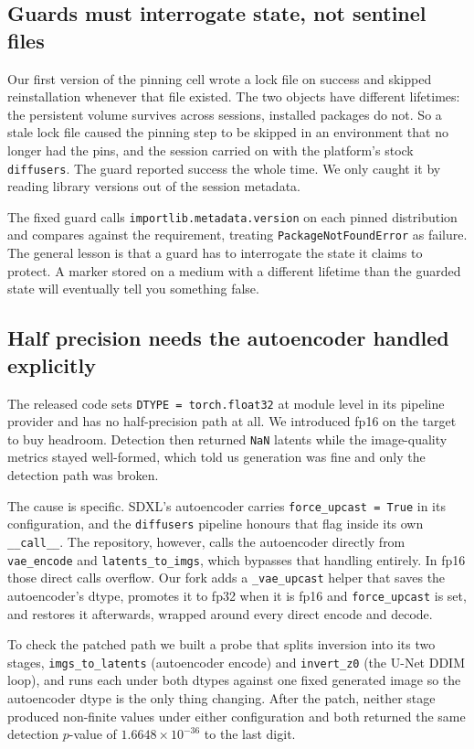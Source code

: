 \documentclass[10pt,twocolumn]{article}
\newcommand{\code}[1]{\texttt{\small #1}}
\begin{document}
\subsection{Guards must interrogate state, not sentinel files}

Our first version of the pinning cell wrote a lock file on success and skipped
reinstallation whenever that file existed. The two objects have different lifetimes:
the persistent volume survives across sessions, installed packages do not. So a stale
lock file caused the pinning step to be skipped in an environment that no longer had
the pins, and the session carried on with the platform's stock \code{diffusers}. The
guard reported success the whole time. We only caught it by reading library versions
out of the session metadata.

The fixed guard calls \code{importlib.metadata.version} on each pinned distribution
and compares against the requirement, treating \code{PackageNotFoundError} as failure.
The general lesson is that a guard has to interrogate the state it claims to protect.
A marker stored on a medium with a different lifetime than the guarded state will
eventually tell you something false.

\subsection{Half precision needs the autoencoder handled explicitly}
\label{sec:fp16}

The released code sets \code{DTYPE = torch.float32} at module level in its pipeline
provider and has no half-precision path at all. We introduced fp16 on the target to
buy headroom. Detection then returned \code{NaN} latents while the image-quality
metrics stayed well-formed, which told us generation was fine and only the detection
path was broken.

The cause is specific. SDXL's autoencoder carries \code{force\_upcast = True} in its
configuration, and the \code{diffusers} pipeline honours that flag inside its own
\code{\_\_call\_\_}. The repository, however, calls the autoencoder directly from
\code{vae\_encode} and \code{latents\_to\_imgs}, which bypasses that handling
entirely. In fp16 those direct calls overflow. Our fork adds a
\code{\_vae\_upcast} helper that saves the autoencoder's dtype, promotes it to fp32
when it is fp16 and \code{force\_upcast} is set, and restores it afterwards, wrapped
around every direct encode and decode.

To check the patched path we built a probe that splits inversion into its two stages,
\code{imgs\_to\_latents} (autoencoder encode) and \code{invert\_z0} (the U-Net DDIM
loop), and runs each under both dtypes against one fixed generated image so the
autoencoder dtype is the only thing changing. After the patch, neither stage produced
non-finite values under either configuration and both returned the same detection
$p$-value of $1.6648 \times 10^{-36}$ to the last digit.
\end{document}
